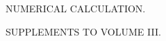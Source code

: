 \thispagestyle{empty}
\vspace*{.22\textheight}
\begin{center}
{\Large NUMERICAL CALCULATION.}\par\bigskip
{\large SUPPLEMENTS TO VOLUME III.}
\end{center}
\clearpage
